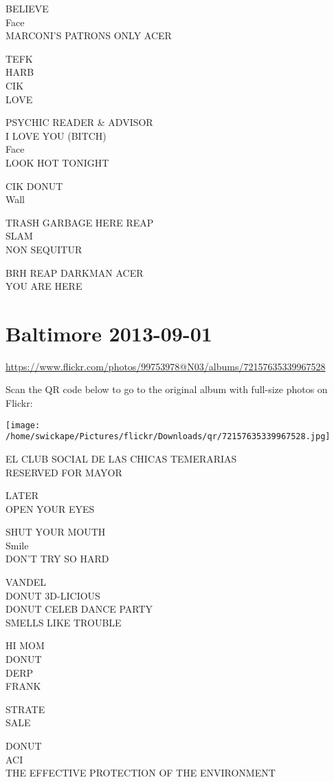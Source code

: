 \documentclass[10pt,letterpaper]{article}
\begin{document}
BELIEVE\\
Face\\
MARCONI'S PATRONS ONLY ACER

TEFK\\
HARB\\
CIK\\
LOVE

PSYCHIC READER \& ADVISOR\\
I LOVE YOU (BITCH)\\
Face\\
LOOK HOT TONIGHT

CIK DONUT\\
Wall

TRASH GARBAGE HERE REAP\\
SLAM\\
NON SEQUITUR

BRH REAP DARKMAN ACER\\
YOU ARE HERE


\section*{Baltimore 2013-09-01}

\url{https://www.flickr.com/photos/99753978@N03/albums/72157635339967528}

Scan the QR code below to go to the original album with full-size photos on Flickr:

\texttt{[image: /home/swickape/Pictures/flickr/Downloads/qr/72157635339967528.jpg]}


EL CLUB SOCIAL DE LAS CHICAS TEMERARIAS\\
RESERVED FOR MAYOR

LATER\\
OPEN YOUR EYES

SHUT YOUR MOUTH\\
Smile\\
DON'T TRY SO HARD

VANDEL\\
DONUT 3D{-}LICIOUS\\
DONUT CELEB DANCE PARTY\\
SMELLS LIKE TROUBLE

HI MOM\\
DONUT\\
DERP\\
FRANK

STRATE\\
SALE

DONUT\\
ACI\\
THE EFFECTIVE PROTECTION OF THE ENVIRONMENT
\end{document}

